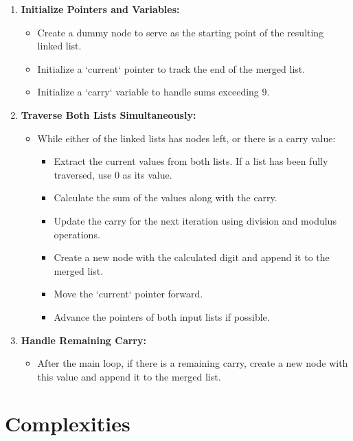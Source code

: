 \begin{enumerate}
    \item \textbf{Initialize Pointers and Variables:}
    \begin{itemize}
        \item Create a dummy node to serve as the starting point of the resulting linked list.
        \item Initialize a `current` pointer to track the end of the merged list.
        \item Initialize a `carry` variable to handle sums exceeding 9.
    \end{itemize}
    
    \item \textbf{Traverse Both Lists Simultaneously:}
    \begin{itemize}
        \item While either of the linked lists has nodes left, or there is a carry value:
        \begin{itemize}
            \item Extract the current values from both lists. If a list has been fully traversed, use 0 as its value.
            \item Calculate the sum of the values along with the carry.
            \item Update the carry for the next iteration using division and modulus operations.
            \item Create a new node with the calculated digit and append it to the merged list.
            \item Move the `current` pointer forward.
            \item Advance the pointers of both input lists if possible.
        \end{itemize}
    \end{itemize}
    
    \item \textbf{Handle Remaining Carry:}
    \begin{itemize}
        \item After the main loop, if there is a remaining carry, create a new node with this value and append it to the merged list.
    \end{itemize}
\end{enumerate}

\section*{Complexities}

